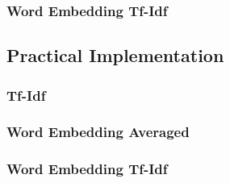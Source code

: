             \subsubsection{Word Embedding Tf-Idf}
            \subsection{Practical Implementation}
            \subsubsection{Tf-Idf}
            \subsubsection{Word Embedding Averaged}
            \subsubsection{Word Embedding Tf-Idf}
            
            
            
            
            
            